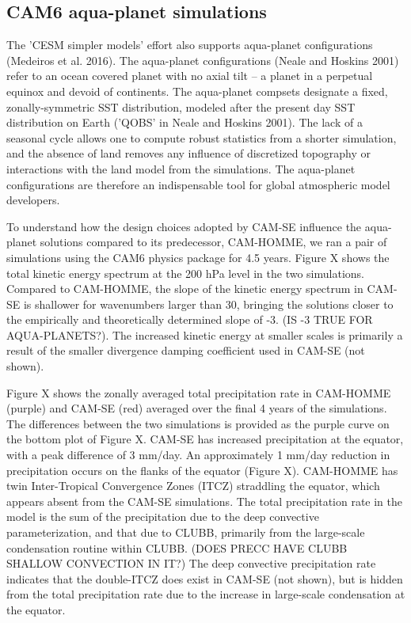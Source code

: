 \subsection{CAM6 aqua-planet simulations}

The 'CESM simpler models' effort also supports aqua-planet configurations (Medeiros et al. 2016). The aqua-planet configurations (Neale and Hoskins 2001) refer to an ocean covered planet with no axial tilt -- a planet in a perpetual equinox and devoid of continents. The aqua-planet compsets designate a fixed, zonally-symmetric SST distribution, modeled after the present day SST distribution on Earth ('QOBS' in Neale and Hoskins 2001). The lack of a seasonal cycle allows one to compute robust statistics from a shorter simulation, and the absence of land removes any influence of discretized topography or interactions with the land model from the simulations. The aqua-planet configurations are therefore an indispensable tool for global atmospheric model developers.

To understand how the design choices adopted by CAM-SE influence the aqua-planet solutions compared to its predecessor, CAM-HOMME, we ran a pair of simulations using the CAM6 physics package for 4.5 years. Figure X shows the total kinetic energy spectrum at the 200 hPa level in the two simulations. Compared to CAM-HOMME, the slope of the kinetic energy spectrum in CAM-SE is shallower for wavenumbers larger than 30, bringing the solutions closer to the empirically and theoretically determined slope of -3. (IS -3 TRUE FOR AQUA-PLANETS?). The increased kinetic energy at smaller scales is primarily a result of the smaller divergence damping coefficient used in CAM-SE (not shown).

Figure X shows the zonally averaged total precipitation rate in CAM-HOMME (purple) and CAM-SE (red) averaged over the final 4 years of the simulations. The differences between the two simulations is provided as the purple curve on the bottom plot of Figure X. CAM-SE has increased precipitation at the equator, with a peak difference of 3 mm/day. An approximately 1 mm/day reduction in precipitation occurs on the flanks of the equator (Figure X). CAM-HOMME has twin Inter-Tropical Convergence Zones (ITCZ) straddling the equator, which appears absent from the CAM-SE simulations. The total precipitation rate in the model is the sum of the precipitation due to the deep convective parameterization, and that due to CLUBB, primarily from the large-scale condensation routine within CLUBB. (DOES PRECC HAVE CLUBB SHALLOW CONVECTION IN IT?) The deep convective precipitation rate indicates that the double-ITCZ does exist in CAM-SE (not shown), but is hidden from the total precipitation rate due to the increase in large-scale condensation at the equator.

